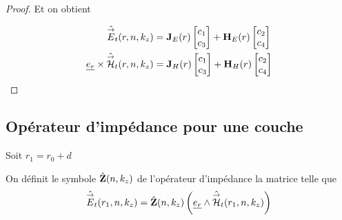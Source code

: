 \begin{proof}
        Et on obtient

        \begin{subequations}
            \label{eq:imp_fourier:cylindre:champs}
            \begin{align}
                \label{eq:imp_fourier:cylindre:champs:E}
                \hat {{\overset{\rightarrow}{E}}}_t(r,n,k_z) &= \mathbf{J}_{E}(r)
                \begin{bmatrix}
                    c_1 \\
                    c_3
                \end{bmatrix}
                +
                \mathbf{H}_{E}(r)
                \begin{bmatrix}
                    c_2 \\
                    c_4
                \end{bmatrix}
                \\
                \label{eq:imp_fourier:cylindre:champs:H}
                \underline{e_r}\times\hat {{\overset{\rightarrow}{\mathcal{H}}}}_t(r,n,k_z) &= 
                \mathbf{J}_{H}(r)
                \begin{bmatrix}
                    c_1 \\
                    c_3
                \end{bmatrix}
                +
                \mathbf{H}_{H}(r)
                \begin{bmatrix}
                    c_2 \\
                    c_4
                \end{bmatrix}
            \end{align}
        \end{subequations}

    \end{proof}



    \subsection{Opérateur d'impédance pour une couche}

        Soit \(r_1 = r_0 + d\)
        \begin{defn}
            On définit le symbole \(\hat {\mathbf{Z}}(n,k_z)\) de l'opérateur d'impédance la matrice telle que
            \begin{equation}
                \hat {{\overset{\rightarrow}{E}}}_t(r_1,n,k_z) = \hat {\mathbf{Z}}(n,k_z) \left(\underline{e_r}\wedge \hat {{\overset{\rightarrow}{\mathcal{H}}}}_t(r_1,n,k_z)\right)
            \end{equation}
        \end{defn}

